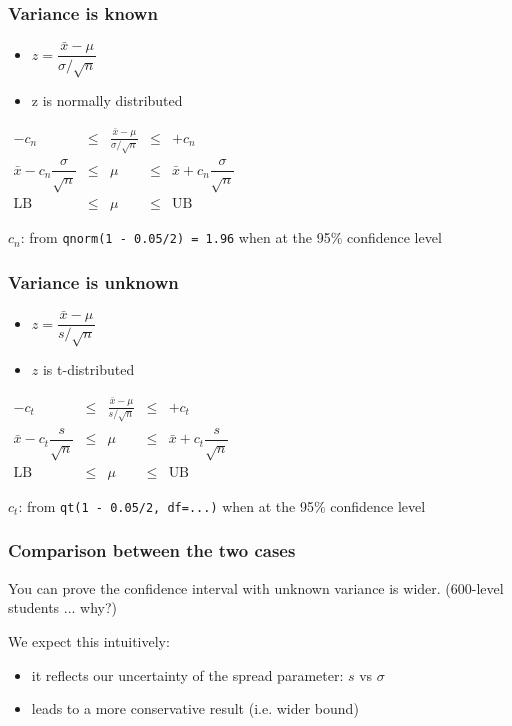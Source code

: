 \begin{frame}\frametitle{Variance is known}
	\begin{itemize}
		\item $z = \dfrac{\bar{x} - \mu}{\sigma/\sqrt{n}}$
		\item z is normally distributed
	\end{itemize}

	$
	\begin{array}{rcccl}
		- c_n &\leq& \displaystyle \frac{\bar{x} - \mu}{\sigma/\sqrt{n}} &\leq & +c_n\\
		\bar{x} - c_n \dfrac{\sigma}{\sqrt{n}} &\leq& \mu &\leq& \bar{x} + c_n\dfrac{\sigma}{\sqrt{n}} \\
		\text{LB} &\leq& \mu &\leq& \text{UB}
	\end{array}
	$

	$c_n$: from \texttt{qnorm(1 - 0.05/2) = 1.96} when at the 95\% confidence level
\end{frame}

\begin{frame}\frametitle{Variance is unknown}
	\begin{itemize}
		\item $z = \dfrac{\bar{x} - \mu}{s/\sqrt{n}}$
		\item $z$ is t-distributed
	\end{itemize}

	$
	\begin{array}{rcccl}
		- c_t &\leq& \displaystyle \frac{\bar{x} - \mu}{s/\sqrt{n}} &\leq & +c_t\\
		\bar{x} - c_t \dfrac{s}{\sqrt{n}} &\leq& \mu &\leq& \bar{x} + c_t\dfrac{s}{\sqrt{n}} \\
		\text{LB} &\leq& \mu &\leq& \text{UB}
	\end{array}
	$

	$c_t$: from \texttt{qt(1 - 0.05/2, df=...)} when at the 95\% confidence level
\end{frame}

\begin{frame}\frametitle{Comparison between the two cases}

	You can prove the confidence interval with unknown variance is wider. (600-level students ... why?)

	We expect this intuitively:
	\begin{itemize}
		\item it reflects our uncertainty of the spread parameter: $s$ vs $\sigma$
		\item leads to a more conservative result (i.e. wider bound)
	\end{itemize}
\end{frame}

